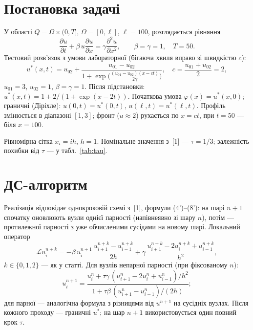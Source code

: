 \documentclass[14pt,a4paper,extarticle]{extarticle}
\newcommand{\uex}{u^*}
\begin{document}
\section{Постановка задачі}

У області $Q=\Omega\times(0,T]$, $\Omega=[0,\ell]$, $\ell=100$, розглядається рівняння
\begin{equation}
  \frac{\partial u}{\partial t} + \beta\, u \frac{\partial u}{\partial x}
  = \gamma \frac{\partial^2 u}{\partial x^2},
  \qquad \beta=\gamma=1,\quad T=50. \label{eq:burgers}
\end{equation}
Тестовий розв'язок з умови лабораторної (бігаюча хвиля вправо зі швидкістю $c$):
\begin{equation}
  \uex(x,t)=u_{02}+\frac{u_{01}-u_{02}}{1+\exp\!\bigl(\frac{(u_{01}-u_{02})(x-ct)}{2\gamma}\bigr)},
  \quad c=\frac{u_{01}+u_{02}}{2}=2,
  \label{eq:uex}
\end{equation}
$u_{01}=3$, $u_{02}=1$, $\beta=\gamma=1$. Після підстановки:
$\uex(x,t)=1+2/(1+\exp(x-2t))$.
Початкова умова $\varphi(x)=\uex(x,0)$; граничні (Діріхле):
$u(0,t)=\uex(0,t)$, $u(\ell,t)=\uex(\ell,t)$.
Профіль змінюється в діапазоні $[1,3]$; фронт ($u\approx 2$) рухається по $x=ct$, при $t=50$ --- біля $x=100$.

Рівномірна сітка $x_i=ih$, $h=1$. Номінальне значення з~[1] --- $\tau=1/3$; залежність похибки від $\tau$ --- у табл.~\ref{tab:tau}.

\section{ДС-алгоритм}

Реалізація відповідає однокроковій схемі з~[1], формули (4')--(8'): на шарі $n+1$ спочатку оновлюють вузли однієї парності (напівнеявно зі шару $n$), потім --- протилежної парності з уже обчисленими сусідами на новому шарі. Локальний оператор
\begin{equation}
  \mathcal{L}u_i^{n+k}
  = -\beta\, u_i^{n+1}\,\frac{u_{i+1}^{n+k}-u_{i-1}^{n+k}}{2h}
  + \gamma\,\frac{u_{i+1}^{n+k}-2u_i^{n+k}+u_{i-1}^{n+k}}{h^2},
\end{equation}
$k\in\{0,1,2\}$ --- як у статті. Для вузлів непарної парності (при фіксованому $n$):
\begin{equation}
  u_i^{n+1}=\frac{u_i^n+\tau\gamma\,(u_{i+1}^n-2u_i^n+u_{i-1}^n)/h^2}
  {1+\tau\beta\,(u_{i+1}^n-u_{i-1}^n)/(2h)};
\end{equation}
для парної --- аналогічна формула з різницями від $u^{n+1}$ на сусідніх вузлах. Після кожного проходу --- граничні $\uex$; на шар $n+1$ використовується один повний крок $\tau$.
\end{document}
